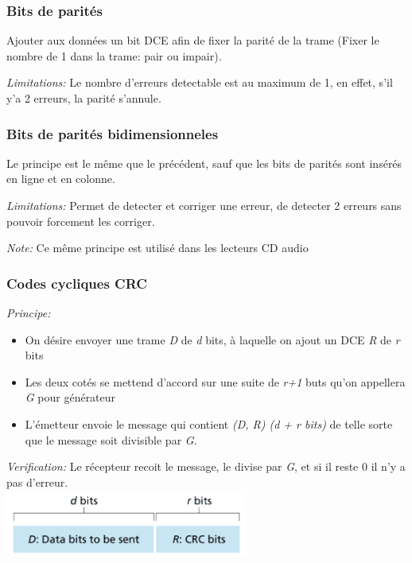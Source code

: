 \documentclass[a4paper, 12pt, french]{article}
\begin{document}
	\subsubsection{Bits de parités}

	Ajouter aux données un bit DCE afin de fixer la parité de la trame (Fixer le nombre de 1 dans la trame: pair ou impair).

	\emph{Limitations:} Le nombre d'erreurs detectable est au maximum de 1, en effet, s'il y'a 2 erreurs, la parité s'annule.

	\subsubsection{Bits de parités bidimensionneles}

	Le principe est le même que le précédent, sauf que les bits de parités sont insérés en ligne et en colonne.

	\emph{Limitations:} Permet de detecter et corriger une erreur, de detecter 2 erreurs sans pouvoir forcement les corriger.

	\emph{Note:} Ce même principe est utilisé dans les lecteurs CD audio

	\subsubsection{Codes cycliques CRC}

	\emph{Principe:}
	\begin{itemize}
		\item On désire envoyer une trame \emph{D} de \emph{d} bits, à laquelle on ajout un DCE \emph{R} de \emph{r} bits
		\item Les deux cotés se mettend d'accord sur une suite de \emph{r+1} buts qu'on appellera \emph{G} pour générateur
		\item L'émetteur envoie le message qui contient \emph{(D, R) (d + r bits)} de telle sorte que le message soit divisible par \emph{G}.
	\end{itemize}

	\emph{Verification:} Le récepteur recoit le message, le divise par \emph{G}, et si il reste 0 il n'y a pas d'erreur.\\

	\includegraphics[width=8cm]{reseau_crc_principe}
\end{document}
